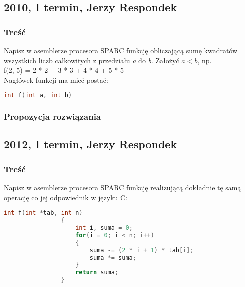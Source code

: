 	\newpage
	\subsection{2010, I termin, Jerzy Respondek}
		\subsubsection{Treść}
			Napisz w asemblerze procesora SPARC funkcję obliczającą sumę kwadratów wszystkich liczb całkowitych z przedziału \emph{a} do \emph{b}. Założyć $ a < b $, np.\\
			f(2, 5) = 2 * 2 + 3 * 3 + 4 * 4 + 5 * 5\\
			Nagłówek funkcji ma mieć postać:
			\begin{lstlisting}[language=C]
				int f(int a, int b)
			\end{lstlisting}
		\subsubsection{Propozycja rozwiązania}
	\newpage
	\subsection{2012, I termin, Jerzy Respondek}
		\subsubsection{Treść}
			Napisz w asemblerze procesora SPARC funkcję realizującą dokładnie tę samą operację co jej odpowiednik w języku C:
			\begin{lstlisting}[language=C]
				int f(int *tab, int n)
				{
					int i, suma = 0;
					for(i = 0; i < n; i++)
					{
						suma -= (2 * i + 1) * tab[i];
						suma *= suma;
					}
					return suma;
				}
			\end{lstlisting}
